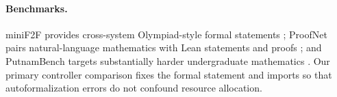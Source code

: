\paragraph{Benchmarks.}
miniF2F provides cross-system Olympiad-style formal statements
\cite{zheng2021minif2f}; ProofNet pairs natural-language mathematics with Lean
statements and proofs \cite{azerbayev2023proofnet}; and PutnamBench targets
substantially harder undergraduate mathematics
\cite{tsoukalas2024putnambench}. Our primary controller comparison fixes the
formal statement and imports so that autoformalization errors do not confound
resource allocation.
